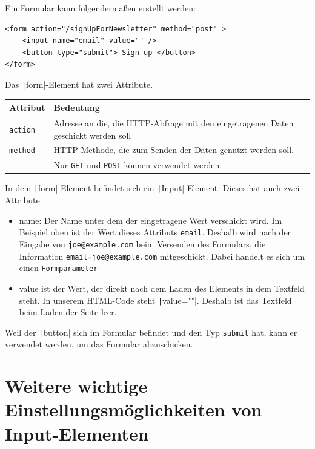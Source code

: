 \documentclass[a4paper]{scrartcl}
\begin{document}
Ein Formular kann folgendermaßen erstellt werden:

\begin{verbatim}
<form action="/signUpForNewsletter" method="post" >
    <input name="email" value="" />
    <button type="submit"> Sign up </button>
</form>
\end{verbatim}

Das  \texttt|form|-Element hat zwei Attribute.

\begin{table}[H]
\begin{tabular}{ll}
Attribut & Bedeutung \\
\hline
\texttt{action} & Adresse an die, die  HTTP-Abfrage mit den eingetragenen Daten geschickt werden soll \\

\texttt{method} & HTTP-Methode, die zum Senden der Daten genutzt werden soll.
\\
 & Nur \texttt{GET} und \texttt{POST} können verwendet werden.\\


\end{tabular}
\end{table}



In dem \texttt|form|-Element befindet sich ein \texttt|Input|-Element.
Dieses hat auch zwei Attribute.

\begin{itemize}
\item{name}: Der Name unter dem der eingetragene Wert verschickt wird. Im Beispiel oben ist der Wert dieses Attributs \texttt{email}. Deshalb wird nach der Eingabe von \texttt{joe@example.com} beim Versenden des Formulars, die Information \texttt{email=joe@example.com} mitgeschickt. Dabei handelt es sich um einen \texttt{Formparameter}
\item {value} ist der Wert, der direkt nach dem Laden des Elements in dem Textfeld steht. In unserem HTML-Code steht \texttt|value=""|. Deshalb ist das Textfeld beim Laden der Seite leer.
\end{itemize}


Weil der \texttt|button| sich im Formular befindet und den Typ \texttt{submit} hat, kann er verwendet werden, um das Formular abzuschicken.

\section{Weitere wichtige Einstellungsmöglichkeiten von Input-Elementen}
\end{document}
